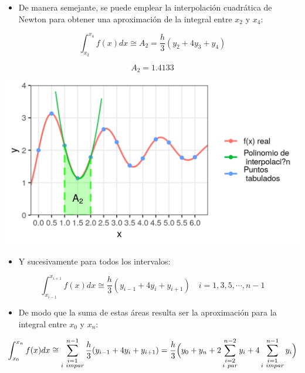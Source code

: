 \documentclass[openany]{book}
\providecommand{\tightlist}{%
  \setlength{\itemsep}{0pt}\setlength{\parskip}{0pt}}
\begin{document}
\begin{itemize}
\tightlist
\item
  De manera semejante, se puede emplear la interpolación cuadrática de Newton para obtener una aproximación de la integral entre \(x_2\) y \(x_4\):
\end{itemize}

\[
\int_{x_2}^{x_4} f(x)dx \cong A_2 = \frac{h}{3} (y_2 + 4y_3 + y_4)
\]

\[A_2=1.4133\]

\begin{center}\includegraphics[width=1\linewidth]{Plots/U4/Unidad4_2_g6} \end{center}

\begin{itemize}
\tightlist
\item
  Y sucesivamente para todos los intervalos:
\end{itemize}

\[
\int_{x_{i-1}}^{x_{i+1}} f(x)dx \cong  \frac{h}{3} (y_{i-1} + 4y_i + y_{i+1}) \quad i = 1, 3, 5, \cdots, n-1
\]

\begin{itemize}
\tightlist
\item
  De modo que la suma de estas áreas resulta ser la aproximación para la integral entre \(x_0\) y \(x_n\):
\end{itemize}

\[
\int_{x_{0}}^{x_n} f(x)dx \cong \sum\limits_{\substack{i = 1\\ i~impar}}^{n-1} \frac{h}{3} (y_{i-1} + 4y_i + y_{i+1}) = \\ \frac{h}{3} \Big( y_0 + y_n + 2 \sum \limits_{\substack{i = 2\\ i~par}}^{n-2} y_i + 4 \sum\limits_{\substack{i = 1\\ i~impar}}^{n-1} y_i  \Big)
\]
\end{document}

